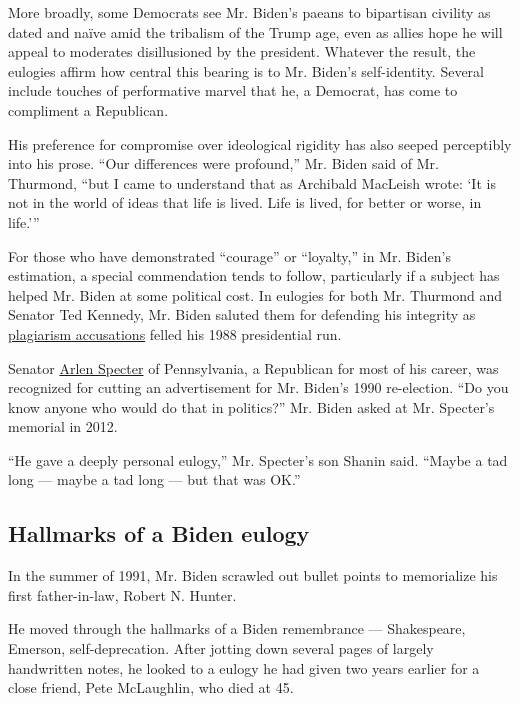 More broadly, some Democrats see Mr. Biden's paeans to bipartisan
civility as dated and naïve amid the tribalism of the Trump age, even as
allies hope he will appeal to moderates disillusioned by the president.
Whatever the result, the eulogies affirm how central this bearing is to
Mr. Biden's self-identity. Several include touches of performative
marvel that he, a Democrat, has come to compliment a Republican.

His preference for compromise over ideological rigidity has also seeped
perceptibly into his prose. ``Our differences were profound,'' Mr. Biden
said of Mr. Thurmond, ``but I came to understand that as Archibald
MacLeish wrote: `It is not in the world of ideas that life is lived.
Life is lived, for better or worse, in life.'''

For those who have demonstrated ``courage'' or ``loyalty,'' in Mr.
Biden's estimation, a special commendation tends to follow, particularly
if a subject has helped Mr. Biden at some political cost. In eulogies
for both Mr. Thurmond and Senator Ted Kennedy, Mr. Biden saluted them
for defending his integrity as
\href{https://www.nytimes.com/2019/06/03/us/politics/biden-1988-presidential-campaign.html}{plagiarism
accusations} felled his 1988 presidential run.

Senator
\href{https://www.nytimes.com/2012/10/15/us/politics/arlen-specter-senator-dies-at-82.html}{Arlen
Specter} of Pennsylvania, a Republican for most of his career, was
recognized for cutting an advertisement for Mr. Biden's 1990
re-election. ``Do you know anyone who would do that in politics?'' Mr.
Biden asked at Mr. Specter's memorial in 2012.

``He gave a deeply personal eulogy,'' Mr. Specter's son Shanin said.
``Maybe a tad long --- maybe a tad long --- but that was OK.''

\hypertarget{hallmarks-of-a-biden-eulogy}{%
\subsection{Hallmarks of a Biden
eulogy}\label{hallmarks-of-a-biden-eulogy}}

In the summer of 1991, Mr. Biden scrawled out bullet points to
memorialize his first father-in-law, Robert N. Hunter.

He moved through the hallmarks of a Biden remembrance --- Shakespeare,
Emerson, self-deprecation. After jotting down several pages of largely
handwritten notes, he looked to a eulogy he had given two years earlier
for a close friend, Pete McLaughlin, who died at 45.


